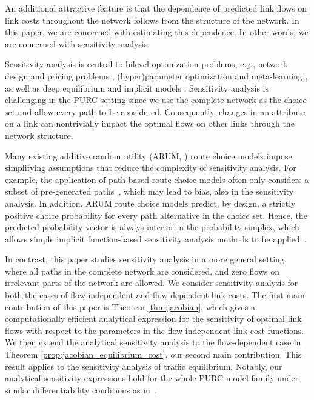 \documentclass[a4paper,11pt]{article}
\begin{document}
An additional attractive feature is that the dependence of predicted link flows on link costs throughout the network follows from the structure of the network. In this paper, we are concerned with estimating this dependence. In other words, we are concerned with sensitivity analysis.

Sensitivity analysis is central to bilevel optimization problems, e.g., network design and pricing problems \citep{yang1997traffic,josefsson2007sensitivity}, (hyper)parameter optimization and meta-learning \citep{franceschi2018bilevel,lorraine2020optimizing}, as well as deep equilibrium and implicit models \citep{bai2019deep}. Sensitivity analysis is challenging in the PURC setting since we use the complete network as the choice set and allow every path to be considered. Consequently, changes in an attribute on a link can nontrivially impact the optimal flows on other links through the network structure. %

Many existing additive random utility (ARUM, \cite{mcfadden_econometric_1981}) route choice models impose simplifying assumptions that reduce the complexity of sensitivity analysis. For example, the application of path-based route choice models often only considers a subset of pre-generated paths~\citep{vovsha_link-nested_1998,duncan2020path}, which may lead to bias, also in the sensitivity analysis. 
In addition, ARUM route choice models predict, by design, a strictly positive choice probability for every path alternative in the choice set. Hence, the predicted probability vector is always interior in the probability simplex, which allows simple implicit function-based sensitivity analysis methods to be applied~\citep{tobin1988sensitivity}.

In contrast, this paper studies sensitivity analysis in a more general setting, where all paths in the complete network are considered, and zero flows on irrelevant parts of the network are allowed. We consider sensitivity analysis for both the cases of flow-independent and flow-dependent link costs.
The first main contribution of this paper is Theorem \ref{thm:jacobian}, which gives a computationally efficient analytical expression for the sensitivity of optimal link flows with respect to the parameters in the flow-independent link cost functions. 
We then extend the analytical sensitivity analysis to the flow-dependent case in Theorem \ref{prop:jacobian_equilibrium_cost}, our second main contribution. This result applies to the sensitivity analysis of traffic equilibrium. 
Notably, our analytical sensitivity expressions hold for the whole PURC model family under similar differentiability conditions as in~\cite{patriksson_sensitivity_2004}. 
\end{document}

